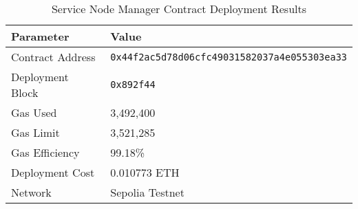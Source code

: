 
\begin{table}[h!]
\centering
\caption{Service Node Manager Contract Deployment Results}
\label{tab:contract_deployment}
\begin{tabular}{|l|l|}
\hline
\textbf{Parameter} & \textbf{Value} \\
\hline
Contract Address & \texttt{0x44f2ac5d78d06cfc49031582037a4e055303ea33} \\
\hline
Deployment Block & \texttt{0x892f44} \\
\hline
Gas Used & 3,492,400 \\
\hline
Gas Limit & 3,521,285 \\
\hline
Gas Efficiency & 99.18\% \\
\hline
Deployment Cost & 0.010773 ETH \\
\hline
Network & Sepolia Testnet \\
\hline
\end{tabular}
\end{table}
